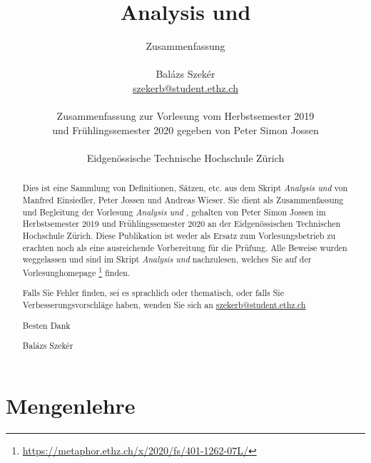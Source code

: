 \documentclass[a4paper,leqno]{article}
\title{Analysis \uproman{1} und \uproman{2}}
\author{Zusammenfassung \\ \\ Balázs Szekér \\ \href{mailto:szekerb@student.ethz.ch}{szekerb@student.ethz.ch} \\ \\
Zusammenfassung zur Vorlesung vom Herbstsemester 2019 \\ und 
Frühlingssemester 2020 gegeben von Peter Simon Jossen
\\
\\
Eidgenössische Technische Hochschule Zürich}
\begin{document}
  
\begin{titlepage}
    \maketitle
    \thispagestyle{empty}
\end{titlepage}  
\newpage
{}
\thispagestyle{myplain}


\begin{abstract}
    Dies ist eine Sammlung von Definitionen, Sätzen, etc. aus dem Skript
    \textit{Analysis  und } von Manfred Einsiedler,
    Peter Jossen und Andreas Wieser. Sie dient als Zusammenfassung
    und Begleitung der Vorlesung \textit{Analysis  und }, gehalten von
    Peter Simon Jossen im Herbstsemester 2019 und Frühlingssemester 2020 an der
    Eidgenössischen Technischen Hochschule Zürich. Diese Publikation ist weder als Ersatz zum Vorlesungsbetrieb
    zu erachten noch als eine ausreichende Vorbereitung für die Prüfung.
    Alle Beweise wurden weggelassen und sind im Skript \textit{Analysis  und }
    nachzulesen, welches Sie auf der Vorlesunghomepage
    \footnote{\url{https://metaphor.ethz.ch/x/2020/fs/401-1262-07L/}}
    finden.


    \vspace{1\baselineskip}

    Falls Sie Fehler finden, sei es sprachlich oder thematisch, oder
    falls Sie Verbesserungsvorschläge haben,
    wenden Sie sich an \href{mailto:szekerb@student.ethz.ch}{szekerb@student.ethz.ch}

    \vspace{1\baselineskip}

    Besten Dank

    \vspace{1\baselineskip}

    Balázs Szekér
\end{abstract}



\newpage
\thispagestyle{myplain}
\tableofcontents
\thispagestyle{myplain}
\newpage


\section{Mengenlehre}

\vspace{1\baselineskip}
\end{document}

